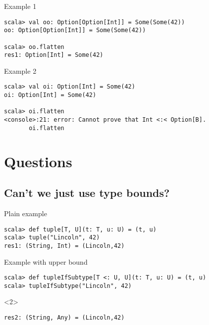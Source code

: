 \documentclass[11pt]{beamer}
\begin{document}
\begin{frame}[fragile]

\begin{block}{Example 1} 
\begin{lstlisting} 
scala> val oo: Option[Option[Int]] = Some(Some(42))
oo: Option[Option[Int]] = Some(Some(42))

scala> oo.flatten
res1: Option[Int] = Some(42)
\end{lstlisting} 
\end{block}

\begin{block}{Example 2}
\begin{lstlisting} 
scala> val oi: Option[Int] = Some(42)
oi: Option[Int] = Some(42)

scala> oi.flatten
<console>:21: error: Cannot prove that Int <:< Option[B].
       oi.flatten
\end{lstlisting} 
\end{block} 
\end{frame}


\section{Questions} 
\subsection{Can’t we just use type bounds?}
\begin{frame}[fragile] {Plain example}
\begin{lstlisting} 
scala> def tuple[T, U](t: T, u: U) = (t, u)
scala> tuple("Lincoln", 42)
res1: (String, Int) = (Lincoln,42)
\end{lstlisting}
\end{frame}

\begin{frame}[fragile] {Example with upper bound}
\begin{lstlisting} 
scala> def tupleIfSubtype[T <: U, U](t: T, u: U) = (t, u)
scala> tupleIfSubtype("Lincoln", 42)
\end{lstlisting} 
\begin{uncoverenv}<2> 
\begin{lstlisting} 
res2: (String, Any) = (Lincoln,42)
\end{lstlisting} 
\end{uncoverenv}
\end{frame}
\end{document}
